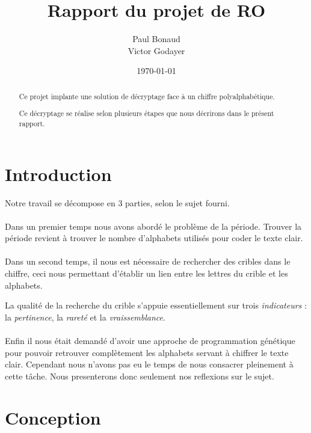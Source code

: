 \documentclass[a4paper, 11pt]{article}
\begin{document}
\title{Rapport du projet de RO}
\author{Paul Bonaud\\
  Victor Godayer}
\date\today

\maketitle

\begin{abstract}
  Ce projet implante une solution de décryptage face à un chiffre
  polyalphabétique.

  Ce décryptage se réalise selon plusieurs étapes que nous décrirons
  dans le présent rapport.
\end{abstract}
\newpage
\tableofcontents
\newpage


\section{Introduction}
Notre travail se décompose en 3 parties, selon le sujet fourni.

\paragraph{}
Dans un premier temps nous avons abordé le problème de la période.
Trouver la période revient à trouver le nombre d'alphabets utilisés pour
coder le texte clair.

\paragraph{}
Dans un second temps, il nous est nécessaire de rechercher des cribles
dans le chiffre, ceci nous permettant d'établir un lien entre les
lettres du crible et les alphabets.

La qualité de la recherche du crible s'appuie essentiellement sur
trois \textit{indicateurs} : la \textit{pertinence}, la
\textit{rareté} et la \textit{vraissemblance}.

\paragraph{}
Enfin il nous était demandé d'avoir une approche de programmation génétique pour
pouvoir retrouver complètement les alphabets servant à chiffrer le
texte clair. Cependant nous n'avons pas eu le temps de nous consacrer
pleinement à cette tâche. Nous presenterons donc seulement nos
reflexions sur le sujet.


\section{Conception}
\end{document}
